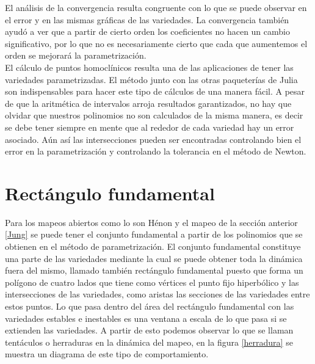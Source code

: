 El análisis de la convergencia resulta congruente con lo que se puede observar en el error y en las mismas gráficas de las variedades. La convergencia también ayudó a ver que a partir de cierto orden los coeficientes no hacen un cambio significativo, por lo que no es necesariamente cierto que cada que aumentemos el orden se mejorará la parametrización.\\


El cálculo de puntos homoclínicos resulta una de las aplicaciones de tener las variedades parametrizadas. El método junto con las otras paqueterías de Julia son indispensables para hacer este tipo de cálculos de una manera fácil. A pesar de que la aritmética de intervalos arroja resultados garantizados, no hay que olvidar que nuestros polinomios no son calculados de la misma manera, es decir se debe tener siempre en mente que al rededor de cada variedad hay un error asociado. Aún así las intersecciones pueden ser encontradas controlando bien el error en la parametrización y controlando la tolerancia en el método de Newton.

\section{Rectángulo fundamental}
Para los mapeos abiertos como lo son Hénon y el mapeo de la sección anterior \ref{Jung} se puede tener el conjunto fundamental a partir de los polinomios que se obtienen en el método de parametrización. El conjunto fundamental constituye una parte de las variedades mediante la cual se puede obtener toda la dinámica fuera del mismo, llamado también rectángulo fundamental puesto que forma un polígono de cuatro lados que tiene como vértices el punto fijo hiperbólico y las intersecciones de las variedades, como aristas las secciones de las variedades entre estos puntos. Lo que pasa dentro del área del rectángulo fundamental con las variedades estables e inestables es una ventana a escala de lo que pasa si se extienden las variedades. A partir de esto podemos observar lo que se llaman tentáculos o herraduras en la dinámica del mapeo, en la figura \ref{herradura} se muestra un diagrama de este tipo de comportamiento.

